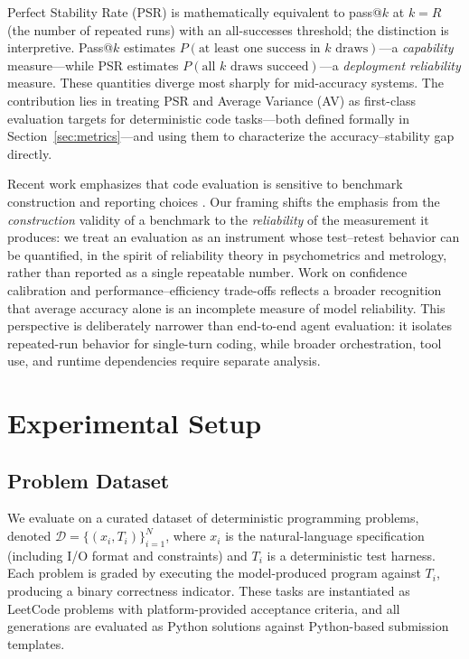 \documentclass{article}
\begin{document}
Perfect Stability Rate (PSR) is mathematically equivalent to pass@$k$ at $k=R$ (the number of repeated runs) with an all-successes threshold; the distinction is interpretive. Pass@$k$ estimates $P(\text{at least one success in }k\text{ draws})$---a \emph{capability} measure---while PSR estimates $P(\text{all }k\text{ draws succeed})$---a \emph{deployment reliability} measure. These quantities diverge most sharply for mid-accuracy systems. The contribution lies in treating PSR and Average Variance (AV) as first-class evaluation targets for deterministic code tasks---both defined formally in Section~\ref{sec:metrics}---and using them to characterize the accuracy--stability gap directly.

Recent work emphasizes that code evaluation is sensitive to benchmark construction and reporting choices \citep{liu2024your,du2024evaluating}. Our framing shifts the emphasis from the \emph{construction} validity of a benchmark to the \emph{reliability} of the measurement it produces: we treat an evaluation as an instrument whose test--retest behavior can be quantified, in the spirit of reliability theory in psychometrics and metrology, rather than reported as a single repeatable number. Work on confidence calibration \citep{guo2017calibration} and performance--efficiency trade-offs \citep{zhang2026performance} reflects a broader recognition that average accuracy alone is an incomplete measure of model reliability. This perspective is deliberately narrower than end-to-end agent evaluation: it isolates repeated-run behavior for single-turn coding, while broader orchestration, tool use, and runtime dependencies require separate analysis.

\section{Experimental Setup}

\subsection{Problem Dataset}
We evaluate on a curated dataset of deterministic programming problems, denoted $\mathcal{D}=\{(x_i, T_i)\}_{i=1}^{N}$, where $x_i$ is the natural-language specification (including I/O format and constraints) and $T_i$ is a deterministic test harness. Each problem is graded by executing the model-produced program against $T_i$, producing a binary correctness indicator. These tasks are instantiated as LeetCode problems with platform-provided acceptance criteria, and all generations are evaluated as Python solutions against Python-based submission templates.
\end{document}
